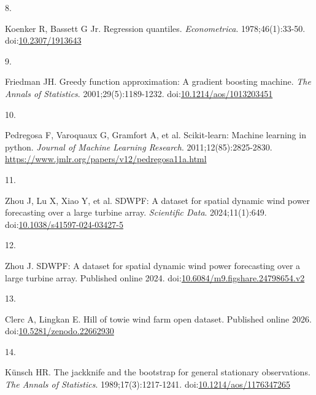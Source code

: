 \documentclass[
  british,
  11pt,
]{article}
\newlength{\cslhangindent}
\newlength{\csllabelwidth}
\newenvironment{CSLReferences}[2] %
 {\begin{list}{}{%
  \setlength{\itemindent}{0pt}
  \setlength{\leftmargin}{0pt}
  \setlength{\parsep}{0pt}
  \ifodd #1
   \setlength{\leftmargin}{\cslhangindent}
   \setlength{\itemindent}{-1\cslhangindent}
  \fi
  \setlength{\itemsep}{#2\baselineskip}}}
 {\end{list}}
\newcommand{\CSLLeftMargin}[1]{\parbox[t]{\csllabelwidth}{\strut#1\strut}}
\newcommand{\CSLRightInline}[1]{\parbox[t]{\linewidth - \csllabelwidth}{\strut#1\strut}}
\begin{document}
\begin{CSLReferences}{0}{1}
\CSLLeftMargin{8. }%
\CSLRightInline{Koenker R, Bassett G Jr. Regression quantiles.
\emph{Econometrica}. 1978;46(1):33-50.
doi:\href{https://doi.org/10.2307/1913643}{10.2307/1913643}}

\CSLLeftMargin{9. }%
\CSLRightInline{Friedman JH. Greedy function approximation: A gradient
boosting machine. \emph{The Annals of Statistics}. 2001;29(5):1189-1232.
doi:\href{https://doi.org/10.1214/aos/1013203451}{10.1214/aos/1013203451}}

\CSLLeftMargin{10. }%
\CSLRightInline{Pedregosa F, Varoquaux G, Gramfort A, et al.
Scikit-learn: Machine learning in python. \emph{Journal of Machine
Learning Research}. 2011;12(85):2825-2830.
\url{https://www.jmlr.org/papers/v12/pedregosa11a.html}}

\CSLLeftMargin{11. }%
\CSLRightInline{Zhou J, Lu X, Xiao Y, et al. {SDWPF}: A dataset for
spatial dynamic wind power forecasting over a large turbine array.
\emph{Scientific Data}. 2024;11(1):649.
doi:\href{https://doi.org/10.1038/s41597-024-03427-5}{10.1038/s41597-024-03427-5}}

\CSLLeftMargin{12. }%
\CSLRightInline{Zhou J. {SDWPF}: A dataset for spatial dynamic wind
power forecasting over a large turbine array. Published online 2024.
doi:\href{https://doi.org/10.6084/m9.figshare.24798654.v2}{10.6084/m9.figshare.24798654.v2}}

\CSLLeftMargin{13. }%
\CSLRightInline{Clerc A, Lingkan E. Hill of towie wind farm open
dataset. Published online 2026.
doi:\href{https://doi.org/10.5281/zenodo.22662930}{10.5281/zenodo.22662930}}

\CSLLeftMargin{14. }%
\CSLRightInline{Künsch HR. The jackknife and the bootstrap for general
stationary observations. \emph{The Annals of Statistics}.
1989;17(3):1217-1241.
doi:\href{https://doi.org/10.1214/aos/1176347265}{10.1214/aos/1176347265}}

\end{CSLReferences}
\end{document}
